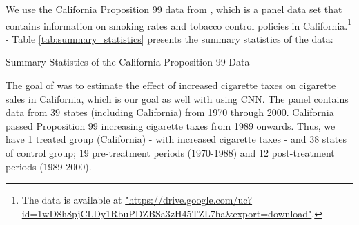We use the California Proposition 99 data from \textcite{abadie2010synthetic}, which is a panel data set that contains information on smoking rates and tobacco control policies in California.\footnote{The
data is available at \url{"https://drive.google.com/uc?id=1wD8h8pjCLDy1RbuPDZBSa3zH45TZL7ha&export=download"}.}
 - Table \ref{tab:summary_statistics} presents the summary statistics of the data:

\begin{table}[htbp]
    \centering
    
    \caption{Summary Statistics of the California Proposition 99 Data}
    \label{tab:summary_statistics}
\end{table}


The goal of \textcite{abadie2010synthetic} was to estimate the effect of increased cigarette taxes on cigarette sales in California, which is our goal as well with using CNN. 
The panel contains data from 39 states (including California) from 1970 through 2000.
 California passed Proposition 99 increasing cigarette taxes from 1989 onwards. Thus, we have 1 treated group (California) - with increased cigarette taxes - and 38 states of control group; 19 pre-treatment periods (1970-1988) and 12 post-treatment periods (1989-2000).

 